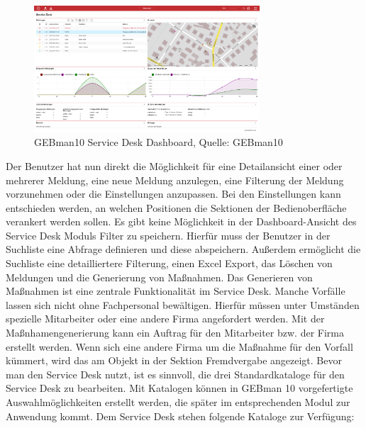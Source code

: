 \begin{figure}[h!]
\centering
	\includegraphics[width=0.75\textwidth]{Abbildungen/GEBman.png}
	\caption[GEBman10 Service Desk Dashboard]{GEBman10 Service Desk Dashboard, Quelle: 
	GEBman10}
	\label{fig:GEBman10 Service Desk Dashboard}
\end{figure}

\noindent
Der Benutzer hat nun direkt die Möglichkeit für eine Detailansicht einer oder mehrerer Meldung, eine neue Meldung anzulegen, eine Filterung der Meldung vorzunehmen oder die Einstellungen anzupassen. Bei den Einstellungen kann entschieden werden, an welchen Positionen die Sektionen der Bedienoberfläche verankert werden sollen.\newline
Es gibt keine Möglichkeit in der Dashboard-Ansicht des Service Desk Moduls Filter zu speichern. Hierfür muss der Benutzer in der Suchliste eine Abfrage definieren und diese abspeichern. Außerdem ermöglicht die Suchliste eine detailliertere Filterung, einen Excel Export, das Löschen von Meldungen und die Generierung von Maßnahmen. Das Generieren von Maßnahmen ist eine zentrale Funktionalität im Service Desk. Manche Vorfälle lassen sich nicht ohne Fachpersonal bewältigen. Hierfür müssen unter Umständen spezielle Mitarbeiter oder eine andere Firma angefordert werden. Mit der Maßnhamengenerierung kann ein Auftrag für den Mitarbeiter bzw. der Firma erstellt werden. Wenn sich eine andere Firma um die Maßnahme für den Vorfall kümmert, wird das am Objekt in der Sektion Fremdvergabe angezeigt. \newline
Bevor man den Service Desk nutzt, ist es sinnvoll, die drei Standardkataloge für den Service Desk zu bearbeiten. Mit Katalogen können in GEBman 10  vorgefertigte Auswahlmöglichkeiten erstellt werden, die später im entsprechenden Modul zur Anwendung kommt. Dem Service Desk stehen folgende Kataloge zur Verfügung:

